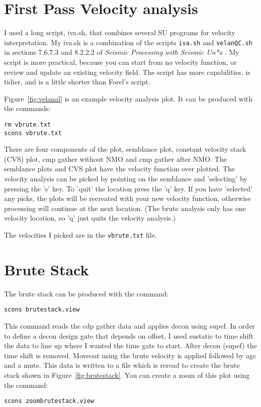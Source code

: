 \section{First Pass Velocity analysis}
I used a long script, iva.sh, that combines several SU programs for velocity 
interpretation.  My iva.sh is a combination of the scripts \texttt{iva.sh} and 
\texttt{velanQC.sh} in sections 7.6.7.3 and 8.2.2.2 of 
\emph{Seismic Processing with Seismic Un*x} \cite[]{forel}.  My script is 
more practical, because you can start from no velocity function, or review 
and update an existing velocity field.  The script has more capabilities, 
is tidier, and is a little shorter than Forel's script.

Figure~\ref{fig:velanal} is an example velocity analysis plot.  It can 
be produced with the commands: 
\begin{verbatim}
rm vbrute.txt 
scons vbrute.txt
\end{verbatim}

There are four components of the plot, semblance plot, constant velocity 
stack (CVS) plot, cmp gather without NMO and cmp gather after NMO.  The 
semblance plots and CVS plot have the velocity function over plotted.  
The velocity analysis can be picked by pointing on the semblance and 
'selecting' by pressing the 's' key.  To 'quit' the location press the 
'q' key.  If you have 'selected' any picks, the plots will be recreated 
with your new velocity function, otherwise processing will continue at 
the next location.  (The brute analysis only has one velocity location, 
so 'q' just quits the velocity analysis.)

The velocities I picked are in the \texttt{vbrute.txt} file.


\section{Brute Stack}
The brute stack can be produced with the command: 
\begin{verbatim}
scons brutestack.view
\end{verbatim}

This command reads the cdp gather data and applies decon using supef.  In 
order to define a decon design gate that depends on offset, I used sustatic 
to time shift the data to line up where I wanted the time gate to start.  
After decon (supef) the time shift is removed.  Moveout using the brute 
velocity is applied followed by agc and a mute.  This data is written to a 
file which is reread to create the brute stack shown in 
Figure~\ref{fig:brutestack}.  You can create a zoom of this plot using the 
command:
\begin{verbatim}
scons zoombrutestack.view
\end{verbatim}

